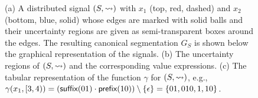 \begin{figure}
\begin{subfigure}{.5\textwidth}
	\end{subfigure}
	\footnotesize{
	\caption{(a) A distributed signal $(S,{\rightsquigarrow})$ with $x_1$ (top, red, dashed) and $x_2$ (bottom, blue, solid) whose edges are marked with solid balls and their uncertainty regions are given as semi-transparent boxes around the edges. The resulting canonical segmentation $G_S$ is shown below the graphical representation of the signals. (b) The uncertainty regions of $(S,{\rightsquigarrow})$ and the corresponding value expressions. (c) The tabular representation of the function $\gamma$ for $(S,{\rightsquigarrow})$, e.g., \(\gamma(x_1, [3,4)) = (\textsf{suffix}(01) \cdot \textsf{prefix}(10)) \setminus \{\epsilon\} = \{ 01, 010, 1, 10\}\).}\label{fig:csve}}
\end{figure}


